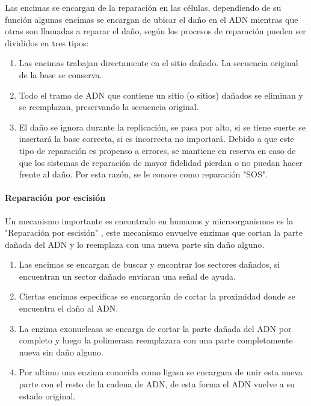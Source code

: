 Las encimas se encargan de la reparación en las células, dependiendo de su función algunas encimas se encargan de ubicar el daño en el ADN mientras que otras son llamadas a reparar el daño, según \cite{Thormod} los procesos de reparación pueden ser divididos en tres tipos:
\begin{enumerate}
\item Las encimas trabajan directamente en el sitio dañado. La secuencia original de la base se conserva.
\item Todo el tramo de ADN que contiene un sitio (o sitios) dañados se eliminan y se reemplazan, preservando la secuencia original.
\item El daño se ignora durante la replicación, se pasa por alto, si se tiene suerte se insertará la base correcta, si es incorrecta no importará. Debido a que este tipo de reparación es propenso a errores, se mantiene en reserva en caso de que los sistemas de reparación de mayor fidelidad pierdan o no puedan hacer frente al daño. Por esta razón, se le conoce como reparación "SOS".
\end{enumerate}


\paragraph{Reparación por escisión}
Un mecanismo importante es encontrado en humanos y microorganismos es la "Reparación por escisión" , este mecanismo envuelve enzimas que cortan la parte dañada del ADN y lo reemplaza con una nueva parte sin daño alguno\cite{Thormod}.
\begin{enumerate}
  \item Las encimas se encargan de buscar y encontrar los sectores dañados, si encuentran un sector dañado enviaran una señal de ayuda.

  \item Ciertas encimas especificas se encargarán de cortar la proximidad donde se encuentra el daño al ADN.

  \item La enzima exonucleasa se encarga de cortar la parte dañada del ADN por completo y luego la polimerasa reemplazara con una parte completamente nueva sin daño alguno.

  \item Por ultimo una enzima conocida como ligasa se encargara de unir esta nueva parte con el resto de la cadena de ADN, de esta forma el ADN vuelve a su estado original.
\end{enumerate}


